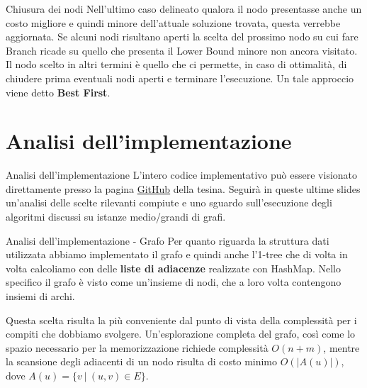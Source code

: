 \documentclass[10pt]{beamer}
\begin{document}
    \begin{frame}{Chiusura dei nodi}
        Nell'ultimo caso delineato qualora il nodo presentasse anche un costo migliore e quindi minore dell'attuale soluzione trovata, questa verrebbe aggiornata.
        \newline
        \newline
        Se alcuni nodi risultano aperti la scelta del prossimo nodo su cui fare Branch ricade su quello che presenta il Lower Bound minore non ancora visitato.\newline
        Il nodo scelto in altri termini è quello che ci permette, in caso di ottimalità, di chiudere prima eventuali nodi aperti e terminare l'esecuzione.
        Un tale approccio viene detto \textbf{Best First}.
    \end{frame}


    \section{Analisi dell'implementazione}\label{sec:analisi-dell'implementazione}
    \begin{frame}{Analisi dell'implementazione}
        L'intero codice implementativo può essere visionato direttamente presso la pagina \href{https://github.com/LorenzoSciandra/Branch-and-BoundTSP}{GitHub} della tesina.
        Seguirà in queste ultime slides un'analisi delle scelte rilevanti compiute e uno sguardo sull'esecuzione degli algoritmi discussi su istanze medio/grandi di grafi.
    \end{frame}

    \begin{frame}{Analisi dell'implementazione - Grafo}
        Per quanto riguarda la struttura dati utilizzata abbiamo implementato il grafo e quindi anche l'1-tree che di volta in volta calcoliamo con delle \textbf{liste di adiacenze} realizzate con HashMap.\newline
        Nello specifico il grafo è visto come un'insieme di nodi, che a loro volta contengono insiemi di archi.

        Questa scelta risulta la più conveniente dal punto di vista della complessità per i compiti che dobbiamo svolgere.
        Un'esplorazione completa del grafo, così come lo spazio necessario per la memorizzazione richiede complessità $O(n+m)$, mentre la scansione degli adiacenti di un nodo risulta di costo minimo $O(|A(u)|)$, dove $A(u) = \{v \:|\: (u,v) \in E\}$.
    \end{frame}
\end{document}

